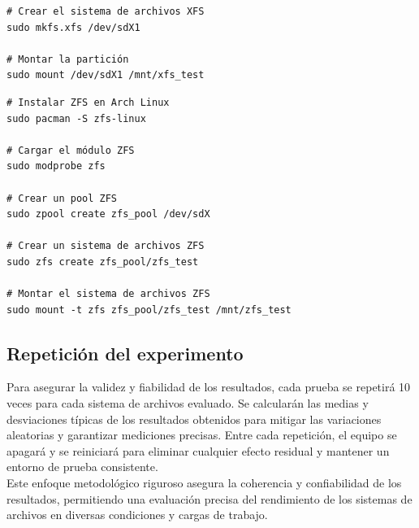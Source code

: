 \begin{tcolorbox}[title=Comandos para XFS]
\begin{verbatim}
# Crear el sistema de archivos XFS
sudo mkfs.xfs /dev/sdX1

# Montar la partición
sudo mount /dev/sdX1 /mnt/xfs_test
\end{verbatim}
\end{tcolorbox}

\begin{tcolorbox}[title=Comandos para ZFS]
\begin{verbatim}
# Instalar ZFS en Arch Linux
sudo pacman -S zfs-linux

# Cargar el módulo ZFS
sudo modprobe zfs

# Crear un pool ZFS
sudo zpool create zfs_pool /dev/sdX

# Crear un sistema de archivos ZFS
sudo zfs create zfs_pool/zfs_test

# Montar el sistema de archivos ZFS 
sudo mount -t zfs zfs_pool/zfs_test /mnt/zfs_test
\end{verbatim}
\end{tcolorbox}

\subsection{Repetición del experimento}

Para asegurar la validez y fiabilidad de los resultados, cada prueba se repetirá 10 veces para cada sistema de archivos evaluado. Se calcularán las medias y desviaciones típicas de los resultados obtenidos para mitigar las variaciones aleatorias y garantizar mediciones precisas. Entre cada repetición, el equipo se apagará y se reiniciará para eliminar cualquier efecto residual y mantener un entorno de prueba consistente.\\

Este enfoque metodológico riguroso asegura la coherencia y confiabilidad de los resultados, permitiendo una evaluación precisa del rendimiento de los sistemas de archivos en diversas condiciones y cargas de trabajo.


